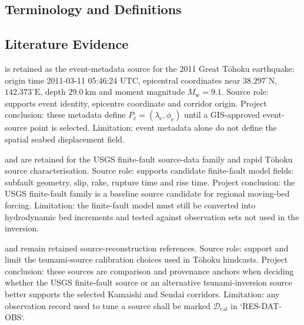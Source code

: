 \subsection{Terminology and Definitions}
\label{sec:res-dat-src-definitions}


\subsection{Literature Evidence}
\label{sec:res-dat-src-literature-evidence}

%

\textcite{usgs2011tohokuEvent} is retained as the event-metadata
source for the 2011 Great Tōhoku earthquake: origin time
2011-03-11 05:46:24 UTC, epicentral coordinates near
$38.297^{\circ}\mathrm{N}$, $142.373^{\circ}\mathrm{E}$, depth
$29.0~\mathrm{km}$ and moment magnitude $M_{\mathrm{w}}=9.1$. Source
role: supports event identity, epicentre coordinate and corridor
origin. Project conclusion: these metadata define
$P_{\mathrm{e}}=(\lambda_{\mathrm{e}},\phi_{\mathrm{e}})$ until a
GIS-approved event-source point is selected. Limitation: event
metadata alone do not define the spatial seabed displacement field.

\textcite{usgsFiniteFaults} and \textcite{hayes2011rapid} are retained
for the USGS finite-fault source-data family and rapid Tōhoku source
characterisation. Source role: supports candidate finite-fault model
fields: subfault geometry, slip, rake, rupture time and rise time.
Project conclusion: the USGS finite-fault family is a baseline source
candidate for regional moving-bed forcing. Limitation: the finite-fault
model must still be converted into hydrodynamic bed increments and
tested against observation sets not used in the inversion.

\textcite{fujii2011tsunamisource} and \textcite{wei2013japan} remain
retained source-reconstruction references. Source role: support and
limit the tsunami-source calibration choices used in Tōhoku hindcasts.
Project conclusion: these sources are comparison and provenance
anchors when deciding whether the USGS finite-fault source or an
alternative tsunami-inversion source better supports the selected
Kamaishi and Sendai corridors. Limitation: any observation record used
to tune a source shall be marked $\mathcal{D}_{\mathrm{cal}}$ in
`RES-DAT-OBS`.

